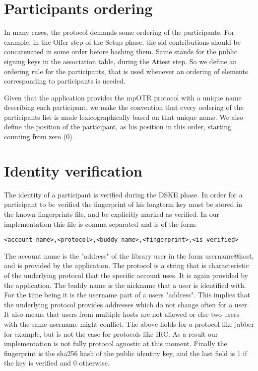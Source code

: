 \section{Participants ordering}
\label{sections:participants_ordering}
In many cases, the protocol demands some ordering of the participants. For example, in the Offer step of the Setup phase, the sid contributions should be concatenated in some order before hashing them. Same stands for the public signing keys in the association table, during the Attest step. So we define an ordering rule for the participants, that is used whenever an ordering of elements corresponding to participants is needed.

Given that the application provides the mpOTR protocol with a unique name describing each participant, we make the convention that every ordering of the participants list is made lexicographically based on that unique name. We also define the position of the participant, as his position in this order, starting counting from zero (0).

\section{Identity verification}
The identity of a participant is verified during the DSKE phase.
In order for a participant to be verified the fingerprint of his longterm key must be stored in the known fingerprints file, and be explicitly marked as verified.
In our implementation this file is comma separated and is of the form:

\begin{verbatim}
<account_name>,<protocol>,<buddy_name>,<fingerprint>,<is_verified>
\end{verbatim}

The account name is the "address" of the library user in the form username@host, and is provided by the application.
The protocol is a string that is characteristic of the underlying protocol that the specific account uses.
It is again provided by the application.
The buddy name is the nickname that a user is identified with.
For the time being it is the username part of a users "address".
This implies that the underlying protocol provides addresses which do not change often for a user.
It also means that users from multiple hosts are not allowed or else two users with the same username might conflict.
The above holds for a protocol like jabber for example, but is not the case for protocols like IRC.
As a result our implementation is not fully protocol agnostic at this moment.
Finally the fingerprint is the sha256 hash of the public identity key, and the last field is 1 if the key is verified and 0 otherwise.

